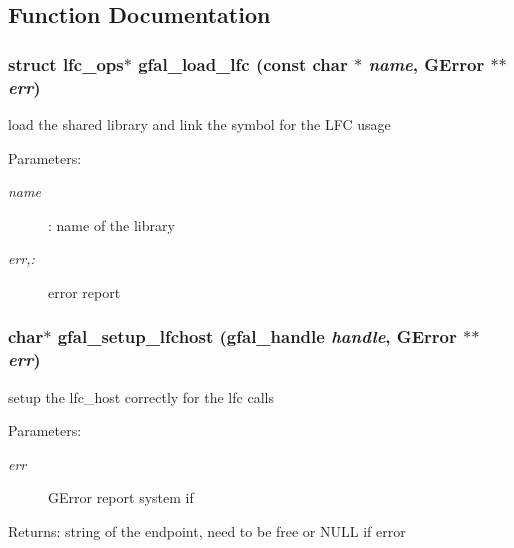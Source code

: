 \subsection{Function Documentation}
\subsubsection{\setlength{\rightskip}{0pt plus 5cm}struct lfc\_\-ops$\ast$ gfal\_\-load\_\-lfc (const char $\ast$ {\em name}, GError $\ast$$\ast$ {\em err})}\label{lfc__ifce__ng_8h_7c91643749a2c5d7e8043c0e42d00fd6}


load the shared library and link the symbol for the LFC usage \begin{Desc}
\item[Parameters:]
\begin{description}
\item[{\em name}]: name of the library \item[{\em err,:}]error report \end{description}
\end{Desc}
\subsubsection{\setlength{\rightskip}{0pt plus 5cm}char$\ast$ gfal\_\-setup\_\-lfchost (gfal\_\-handle {\em handle}, GError $\ast$$\ast$ {\em err})}\label{lfc__ifce__ng_8h_5d13dc09e91f66d74de768c2e4bf4872}


setup the lfc\_\-host correctly for the lfc calls \begin{Desc}
\item[Parameters:]
\begin{description}
\item[{\em err}]GError report system if \end{description}
\end{Desc}
\begin{Desc}
\item[Returns:]string of the endpoint, need to be free or NULL if error \end{Desc}

